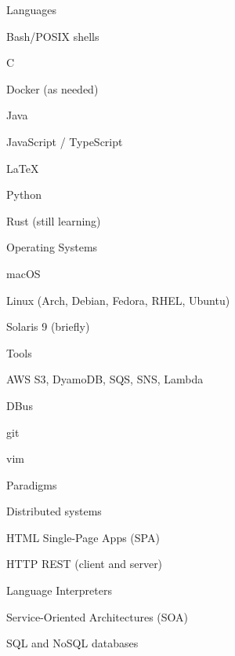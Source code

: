 \documentclass[10pt]{barag_resume}
\begin{document}
\relax
    \vspace{-2em} %
    \begin{multicols}{2}
        \begin{csitemize}{Languages}
            \item Bash/POSIX shells
            \item C
            \item Docker (as needed)
            \item Java
            \item JavaScript / TypeScript
            \item \textrm{\LaTeX}
            \item Python
            \item Rust (still learning)
        \end{csitemize}

        \begin{csitemize}{Operating Systems}
            \item macOS
            \item Linux (Arch, Debian, Fedora, RHEL, Ubuntu)
            \item Solaris 9 (briefly)
        \end{csitemize}

        \begin{csitemize}{Tools}
            \item AWS S3, DyamoDB, SQS, SNS, Lambda
            \item DBus
            \item git
            \item vim
        \end{csitemize}

        \begin{csitemize}{Paradigms}
            \item Distributed systems
            \item HTML Single-Page Apps (SPA)
            \item HTTP REST (client and server)
            \item Language Interpreters
            \item Service-Oriented Architectures (SOA)
            \item SQL and NoSQL databases
        \end{csitemize}
    \end{multicols}
\end{document}
